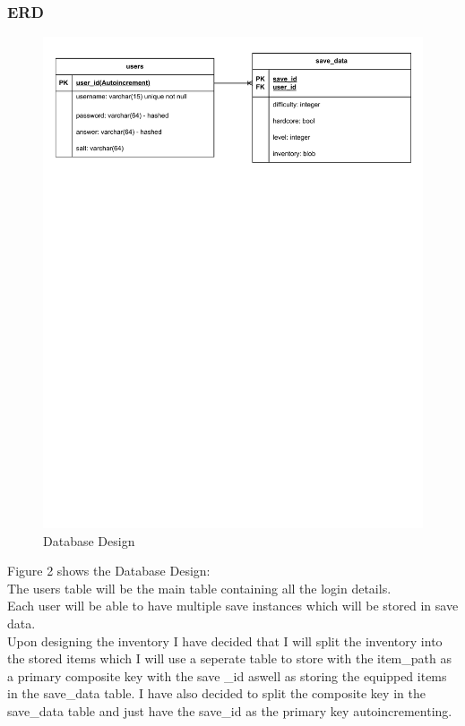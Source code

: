\documentclass{article}
\begin{document}
        \subsubsection{ERD}
        \begin{figure}[H]
                \centering
                \includegraphics[width=\textwidth, trim = 0 575 0 25, clip]{images/design/Database_Design.pdf}
                \caption{Database Design}
                \label{fig:ie_1}
        \end{figure}
        Figure 2 shows the Database Design:\\
        The users table will be the main table containing all the login details.\\
        Each user will be able to have multiple save instances which will be stored in save data.\\
        Upon designing the inventory I have decided that I will split the inventory into the stored items which I will use a seperate table to store with the item\_path as a primary composite key with the save \_id aswell as storing the equipped items in the save\_data table. I have also decided to split the composite key in the save\_data table and just have the save\_id as the primary key autoincrementing.\\
\end{document}
